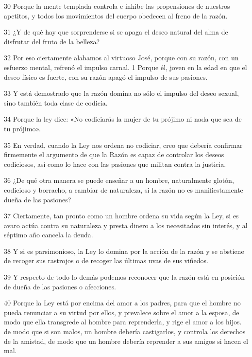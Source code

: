 \par 30 Porque la mente templada controla e inhibe las propensiones de nuestros apetitos, y todos los movimientos del cuerpo obedecen al freno de la razón.

\par 31 ¿Y de qué hay que sorprenderse si se apaga el deseo natural del alma de disfrutar del fruto de la belleza?

\par 32 Por eso ciertamente alabamos al virtuoso José, porque con su razón, con un esfuerzo mental, refrenó el impulso carnal. 1 Porque él, joven en la edad en que el deseo físico es fuerte, con su razón apagó el impulso de sus pasiones.

\par 33 Y está demostrado que la razón domina no sólo el impulso del deseo sexual, sino también toda clase de codicia.

\par 34 Porque la ley dice: «No codiciarás la mujer de tu prójimo ni nada que sea de tu prójimo».

\par 35 En verdad, cuando la Ley nos ordena no codiciar, creo que debería confirmar firmemente el argumento de que la Razón es capaz de controlar los deseos codiciosos, así como lo hace con las pasiones que militan contra la justicia.

\par 36 ¿De qué otra manera se puede enseñar a un hombre, naturalmente glotón, codicioso y borracho, a cambiar de naturaleza, si la razón no es manifiestamente dueña de las pasiones?

\par 37 Ciertamente, tan pronto como un hombre ordena su vida según la Ley, si es avaro actúa contra su naturaleza y presta dinero a los necesitados sin interés, y al séptimo año cancela la deuda.

\par 38 Y si es parsimonioso, la Ley lo domina por la acción de la razón y se abstiene de recoger sus rastrojos o de recoger las últimas uvas de sus viñedos.

\par 39 Y respecto de todo lo demás podemos reconocer que la razón está en posición de dueña de las pasiones o afecciones.

\par 40 Porque la Ley está por encima del amor a los padres, para que el hombre no pueda renunciar a su virtud por ellos, y prevalece sobre el amor a la esposa, de modo que ella transgrede al hombre para reprenderla, y rige el amor a los hijos. de modo que si son malos, un hombre debería castigarlos, y controla los derechos de la amistad, de modo que un hombre debería reprender a sus amigos si hacen el mal.

